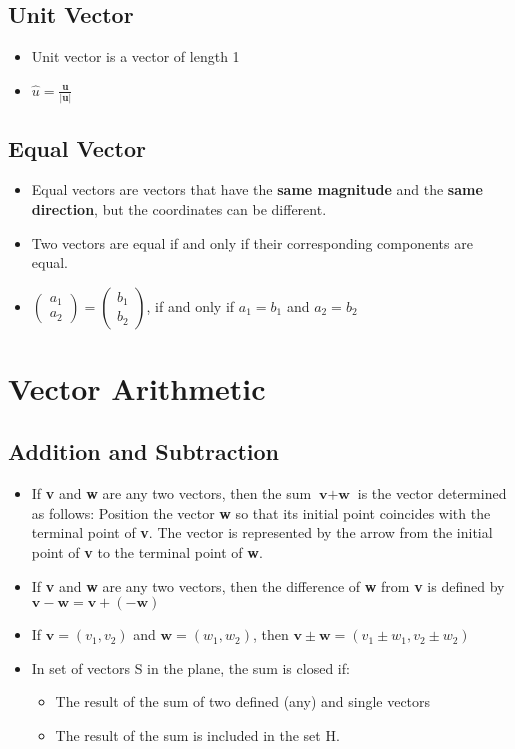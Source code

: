 \documentclass[a4paper,12pt]{article}
\begin{document}
\subsection*{Unit Vector}
\begin{itemize}
  \item Unit vector is a vector of length 1
  \item[] \(\hat{u}=\frac{\textbf{u}}{|\textbf{u}|}\)
\end{itemize}


\subsection*{Equal Vector}
\begin{itemize}
  \item Equal vectors are vectors that have the \textbf{same magnitude} and the \textbf{same direction}, but the coordinates can be different.
  \item Two vectors are equal if and only if their corresponding components are equal.
  \item[] \(\begin{pmatrix} a_1 \\ a_2 \end{pmatrix} = \begin{pmatrix} b_1 \\ b_2 \end{pmatrix}\), if and only if \(a_1 = b_1\) and \(a_2 = b_2\)
\end{itemize}

\section*{Vector Arithmetic}
\subsection*{Addition and Subtraction}
\begin{itemize}
  \item If \textbf{v} and \textbf{w} are any two vectors, then the sum \(\textbf{v} + \textbf{w}\) is the vector determined as follows: Position the vector \textbf{w} so that its initial point coincides with the terminal point of \textbf{v}. The vector is represented by the arrow from the initial point of \textbf{v} to the terminal point of \textbf{w}.
  \item If \textbf{v} and \textbf{w} are any two vectors, then the difference of \textbf{w} from \textbf{v} is defined by \(\textbf{v}-\textbf{w}=\textbf{v}+(-\textbf{w})\)
  \item If \(\textbf{v}=(v_1, v_2)\) and \(\textbf{w}=(w_1, w_2)\), then \(\textbf{v}\pm\textbf{w}=(v_1\pm w_1, v_2\pm w_2)\)
  \item In set of vectors S in the plane, the sum is closed if: \begin{itemize}
          \item The result of the sum of two defined (any) and single vectors
          \item The result of the sum is included in the set H.
        \end{itemize}
\end{itemize}
\end{document}
